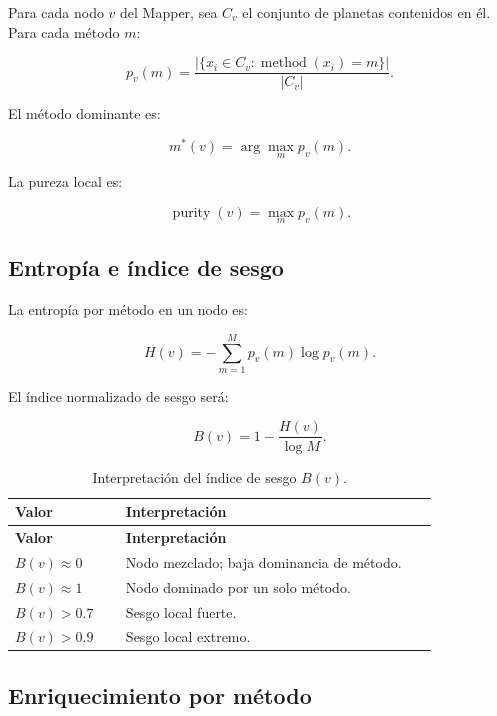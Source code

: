 \documentclass[11pt,letterpaper]{article}
\begin{document}
Para cada nodo $v$ del Mapper, sea $C_v$ el conjunto de planetas contenidos en él. Para cada método $m$:

\begin{equation}
p_v(m)=\frac{|\{x_i\in C_v:\operatorname{method}(x_i)=m\}|}{|C_v|}.
\end{equation}

El método dominante es:

\begin{equation}
m^*(v)=\arg\max_m p_v(m).
\end{equation}

La pureza local es:

\begin{equation}
\operatorname{purity}(v)=\max_m p_v(m).
\end{equation}

\subsection{Entropía e índice de sesgo}

La entropía por método en un nodo es:

\begin{equation}
H(v)=-\sum_{m=1}^{M}p_v(m)\log p_v(m).
\end{equation}

El índice normalizado de sesgo será:

\begin{equation}
B(v)=1-\frac{H(v)}{\log M}.
\end{equation}

\begin{longtable}{p{0.22\linewidth}p{0.62\linewidth}}
\caption{Interpretación del índice de sesgo $B(v)$.}\\
\toprule
\textbf{Valor} & \textbf{Interpretación} \\
\midrule
\endfirsthead
\toprule
\textbf{Valor} & \textbf{Interpretación} \\
\midrule
\endhead
$B(v)\approx 0$ & Nodo mezclado; baja dominancia de método. \\
$B(v)\approx 1$ & Nodo dominado por un solo método. \\
$B(v)>0.7$ & Sesgo local fuerte. \\
$B(v)>0.9$ & Sesgo local extremo. \\
\bottomrule
\end{longtable}

\subsection{Enriquecimiento por método}
\end{document}
